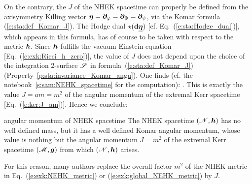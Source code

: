 On the contrary, the
 $J$
of the NHEK spacetime can properly be defined
from the axisymmetry Killing vector
$\bm{\eta} = \bm{\partial}_{\varphi} = \bm{\partial}_{\Phi} = \bm{\partial}_{\psi}$, via
the Komar formula (\ref{e:sta:def_Komar_J}). The Hodge dual $\star(\mathbf{d} \underline{\bm{\eta}})$
[cf. Eq.~(\ref{e:sta:Hodge_dual})], which appears in this formula, has of course to be taken with respect to the metric $\bm{h}$.
Since $\bm{h}$ fulfills the vacuum Einstein equation [Eq.~(\ref{e:exk:Ricci_h_zero})], the value
of $J$ does not depend upon the choice of the integration 2-surface $\mathscr{S}$
in formula~(\ref{e:sta:def_Komar_J})
(Property~\ref{p:sta:invariance_Komar_angu}). One
finds (cf. the notebook~\ref{s:sam:NEHK_spacetime} for the computation):
\be
     .
\ee
This is exactly the value $J = a m = m^2$ of the angular momentum of the
extremal Kerr spacetime [Eq.~(\ref{e:ker:J_am})]. Hence we conclude:
\begin{tprop}{angular momentum of NHEK spacetime}{}
The NHEK spacetime $(\mathscr{N},\bm{h})$ has no well defined mass, but it has a well defined
Komar angular momentum, whose value is nothing but the angular momentum $J = m^2$
of the extremal Kerr spacetime $(\mathscr{M},\bm{g})$ from which $(\mathscr{N},\bm{h})$ arises.
\end{tprop}

\begin{remark}
For this reason, many authors replace the overall factor $m^2$ of the NHEK metric
in Eq.~(\ref{e:exk:NEHK_metric}) or (\ref{e:exk:global_NEHK_metric}) by $J$.
\end{remark}


